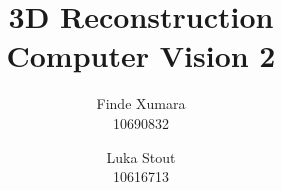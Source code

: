 \documentclass{article}
\title{3D Reconstruction \\ \small{Computer Vision 2}}
\author{Finde Xumara \\ 10690832 \and Luka Stout \\ 10616713}
\begin{document}
\maketitle








\pagebreak

{\small
	
}
\end{document}
